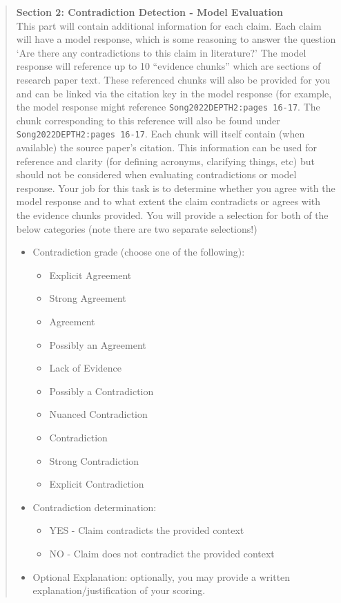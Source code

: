 \documentclass{article}
\begin{document}
\begin{quote}
\textbf{Section 2: Contradiction Detection - Model Evaluation}\\
This part will contain additional information for each claim. Each claim will have a model response, which is some reasoning to answer the question `Are there any contradictions to this claim in literature?' The model response will reference up to 10 “evidence chunks” which are sections of research paper text.
These referenced chunks will also be provided for you and can be linked via the citation key in the model response (for example, the model response might reference \texttt{Song2022DEPTH2:pages 16-17}. The chunk corresponding to this reference will also be found under \texttt{Song2022DEPTH2:pages 16-17}.
Each chunk will itself contain (when available) the source paper's citation. This information can be used for reference and clarity (for defining acronyms, clarifying things, etc) but should not be considered when evaluating contradictions or model response.
Your job for this task is to determine whether you agree with the model response and to what extent the claim contradicts or agrees with the evidence chunks provided.
You will provide a selection for both of the below categories (note there are two separate selections!)
\begin{itemize}
    \item Contradiction grade (choose one of the following):
        \begin{itemize}
            \item Explicit Agreement
            \item Strong Agreement
            \item Agreement
            \item Possibly an Agreement
            \item Lack of Evidence
            \item Possibly a Contradiction
            \item Nuanced Contradiction
            \item Contradiction
            \item Strong Contradiction
            \item Explicit Contradiction
        \end{itemize}
    \item Contradiction determination:
        \begin{itemize}
            \item YES - Claim contradicts the provided context
            \item NO - Claim does not contradict the provided context
        \end{itemize}
    \item Optional Explanation: optionally, you may provide a written explanation/justification of your scoring.
\end{itemize}


\end{quote}
\end{document}
